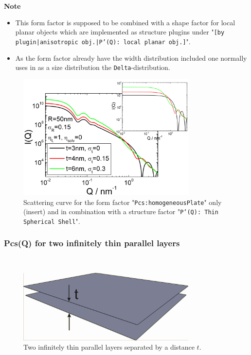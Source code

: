 \noindent
\textbf{Note}
\begin{itemize}
  \item This form factor is supposed to be combined with a shape factor for
local planar objects which are implemented as structure  plugins
under "\texttt{[by plugin|anisotropic obj.|P'(Q): local planar
obj.]}".
\item As the form factor already have the width distribution included one normally uses in \SASfit as a size distribution
the \texttt{Delta}-distribution.
\end{itemize}

\begin{figure}[htb]
\begin{center}
\includegraphics[width=0.8\textwidth,height=0.55\textwidth]{../images/form_factor/anisotropic/localplanarIQ.png}
\end{center}
\caption{Scattering curve for the form factor "\texttt{Pcs:homogeneousPlate}" only (insert) and
in combination with a structure factor "\texttt{P'(Q): Thin Spherical Shell}".}
\label{fig_IQ:homogeneousXS}
\end{figure}

\clearpage
\subsubsection{Pcs(Q) for two infinitely thin parallel layers} ~\\
\label{plugin:Pcs:TwoInfinitelyThinLayers}

\begin{figure}[htb]
\begin{center}
\includegraphics[width=0.8\textwidth,height=0.328\textwidth]{../images/form_factor/anisotropic/planar2thin_txt.png}
\end{center}
\caption{Two infinitely thin parallel layers separated by a distance $t$.}
\label{fig:Pcs:TwoInfinitelyThinLayers}
\end{figure}

